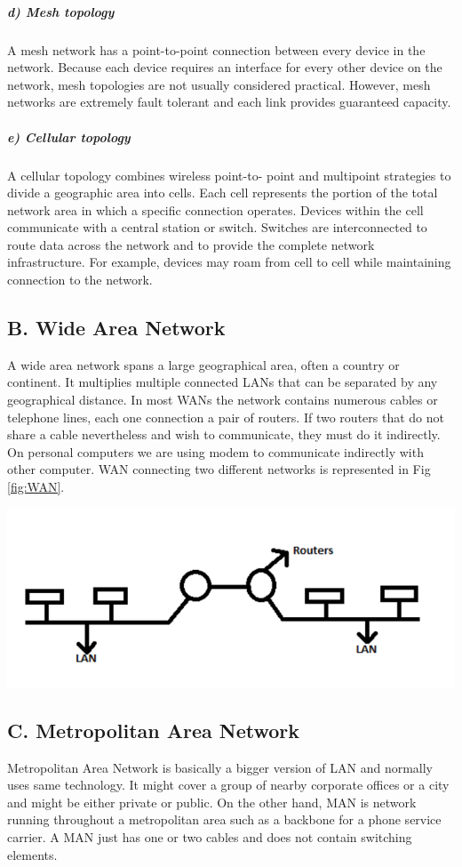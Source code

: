 \documentclass[12pt]{article}
\newenvironment{Figure}
  {\par\medskip\noindent\minipage{\linewidth}}
  {\endminipage\par\medskip}
\begin{document}
\begin{multicols*}{2}
\subparagraph{d) Mesh topology}
\indent A mesh network has a point-to-point connection
between every device in the network. Because each device requires an interface for every other device on
the network, mesh topologies are not usually considered
practical. However, mesh networks are extremely fault
tolerant and each link provides guaranteed capacity.

\subparagraph{e) Cellular topology}
\indent A cellular topology combines wireless point-to-
point and multipoint strategies to divide a geographic
area into cells. Each cell represents the portion of the
total network area in which a specific connection
operates. Devices within the cell communicate with a
central station or switch. Switches are interconnected to
route data across the network and to provide the
complete network infrastructure. For example, devices
may roam from cell to cell while maintaining
connection to the network.

\subsection*{B. Wide Area Network}
\indent \indent A wide area network spans a large geographical
area, often a country or continent. It multiplies multiple
connected LANs that can be separated by any
geographical distance. In most WANs the network
contains numerous cables or telephone lines, each one
connection a pair of routers. If two routers that do not
share a cable nevertheless and wish to communicate,
they must do it indirectly. On personal computers we
are using modem to communicate indirectly with other
computer. WAN connecting two different networks is
represented in Fig \ref{fig:WAN}.

\begin{Figure}
 \centering
 \includegraphics[width=\linewidth]{wan.png}
\label{fig:WAN}
\end{Figure}

\subsection*{C. Metropolitan Area Network}
\indent \indent Metropolitan Area Network is basically a
bigger version of LAN and normally uses same
technology. It might cover a group of nearby corporate
offices or a city and might be either private or public.
On the other hand, MAN is network running throughout
a metropolitan area such as a backbone for a phone
service carrier. A MAN just has one or two cables and
does not contain switching elements.


\end{multicols*}
\end{document}
